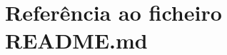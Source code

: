 \hypertarget{_r_e_a_d_m_e_8md}{}\section{Referência ao ficheiro R\+E\+A\+D\+M\+E.\+md}
\label{_r_e_a_d_m_e_8md}
